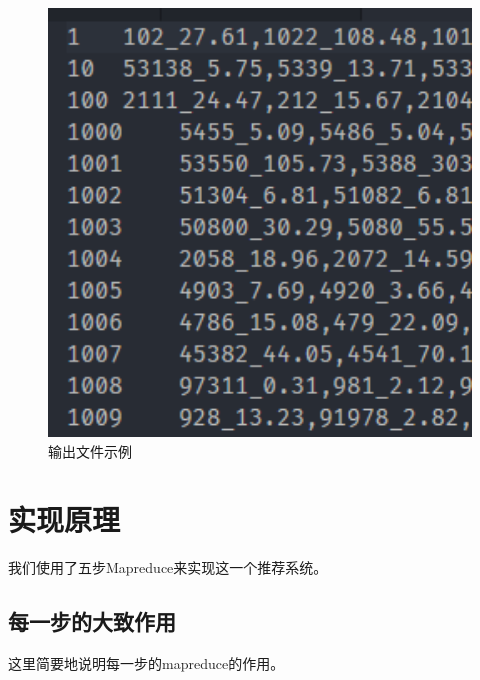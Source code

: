 \documentclass[forprint]{myreport}
\begin{document}
\begin{multicols}{2}
  \columnbreak
    \begin{figure}[htp]
      \centering
      \includegraphics[width=13cm]{figure/2018-07-04-10-31-18.png}
      \caption{输出文件示例}
      \label{fig:example-output}
    \end{figure}
  
\end{multicols}



\section{实现原理}

我们使用了五步Mapreduce来实现这一个推荐系统。

\subsection{每一步的大致作用}

这里简要地说明每一步的mapreduce的作用。
\end{document}

